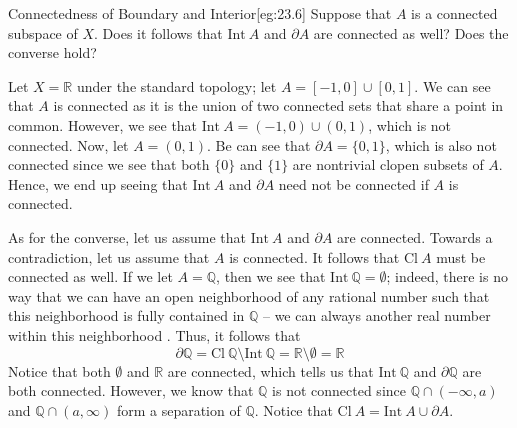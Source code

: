 \begin{egBox}{Connectedness of Boundary and Interior}[eg:23.6]
    Suppose that \( A \) is a connected subspace of \( X \).
    Does it follows that \( \mathrm{Int} \ A \) and \( \partial A \) are
    connected as well?
    Does the converse hold?

    \baseSkip

    Let \( X = \mathbb{R} \) under the standard topology;
    let \( A = [ -1, 0 ] \cup [ 0, 1 ] \).
    We can see that \( A \) is connected as it is the union of two connected 
    sets that share a point in common.
    However, we see that \( \mathrm{Int} \ A = ( -1, 0 ) \cup ( 0, 1 ) \),
    which is not connected. 
    Now, let \( A = ( 0, 1 ) \).
    Be can see that \( \partial A = \{ 0, 1 \} \), which is also not connected
    since we see that both \( \{ 0 \} \) and \( \{ 1 \} \) are nontrivial 
    clopen subsets of \( A \).
    Hence, we end up seeing that \( \mathrm{Int} \ A \) and \( \partial A \) 
    need not be connected if \( A \) is connected.

    \baseSkip

    As for the converse, let us assume that \( \mathrm{Int} \ A \) and
    \( \partial A \) are connected.
    Towards a contradiction, let us assume that \( A \) is connected.
    It follows that \( \mathrm{Cl} \ A \) must be connected as well.
    If we let \( A = \mathbb{Q} \), then we see that 
    \( \mathrm{Int} \ \mathbb{Q} = \emptyset \); indeed, there is no way
    that we can have an open neighborhood of any rational number such that
    this neighborhood is fully contained in \( \mathbb{Q} \) -- we can always 
    another real number within this neighborhood . 
    Thus, it follows that
    \begin{equation*}
        \partial \mathbb{Q} 
        =
        \mathrm{Cl} \ \mathbb{Q} \setminus \mathrm{Int} \ \mathbb{Q}
        =
        \mathbb{R} \setminus \emptyset
        =
        \mathbb{R}
    \end{equation*}
    Notice that both \( \emptyset \) and \( \mathbb{R} \) are connected, which
    tells us that \( \mathrm{Int} \ \mathbb{Q} \) and \( \partial \mathbb{Q} \)
    are both connected.
    However, we know that \( \mathbb{Q} \) is not connected since
    \( \mathbb{Q} \cap ( - \infty, a ) \) and
    \( \mathbb{Q} \cap ( a, \infty ) \) form a separation of \( \mathbb{Q} \).
    Notice that \( \mathrm{Cl} \ A = \mathrm{Int} \ A \cup \partial A \).
\end{egBox}
